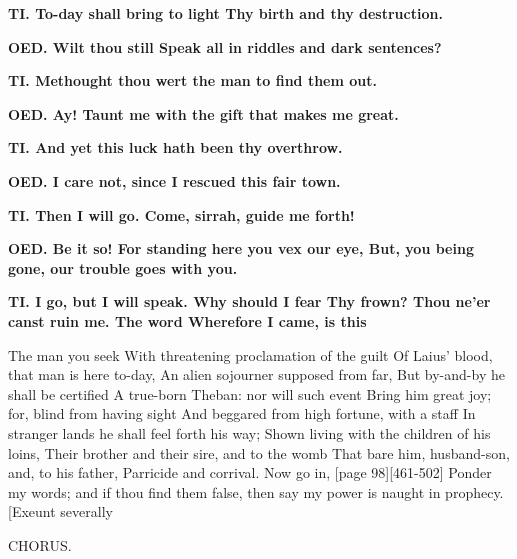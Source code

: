 \documentclass[11pt,letter]{book}
\begin{document}
\par \textbf{TI. To-day shall bring to light Thy birth and thy destruction.}
\par 

\par \textbf{OED. Wilt thou still Speak all in riddles and dark sentences?}
\par 

\par \textbf{TI. Methought thou wert the man to find them out.}
\par 

\par \textbf{OED. Ay! Taunt me with the gift that makes me great.}
\par 

\par \textbf{TI. And yet this luck hath been thy overthrow.}
\par 

\par \textbf{OED. I care not, since I rescued this fair town.}
\par 

\par \textbf{TI. Then I will go. Come, sirrah, guide me forth!}
\par 

\par \textbf{OED. Be it so! For standing here you vex our eye, But, you being gone, our trouble goes with you.}
\par 

\par \textbf{TI. I go, but I will speak. Why should I fear Thy frown? Thou ne’er canst ruin me. The word Wherefore I came, is this}
\par   The man you seek With threatening proclamation of the guilt Of Laius’ blood, that man is here to-day, An alien sojourner supposed from far, But by-and-by he shall be certified A true-born Theban:  nor will such event Bring him great joy; for, blind from having sight And beggared from high fortune, with a staff In stranger lands he shall feel forth his way; Shown living with the children of his loins, Their brother and their sire, and to the womb That bare him, husband-son, and, to his father, Parricide and corrival. Now go in, [page 98][461-502] Ponder my words; and if thou find them false, then say my power is naught in prophecy. [Exeunt severally

\par  CHORUS.
\end{document}
